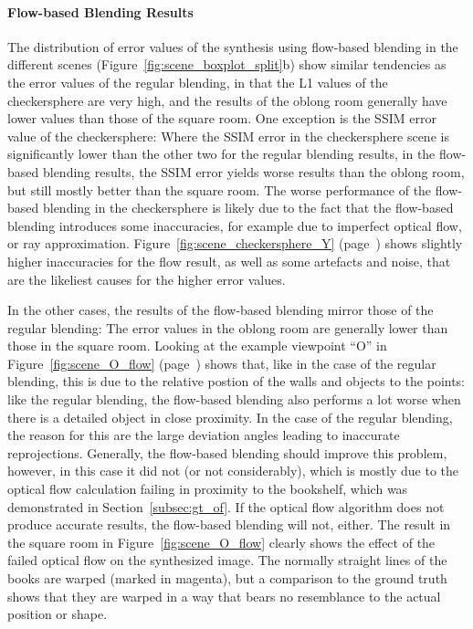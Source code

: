 \paragraph{Flow-based Blending Results}
The distribution of error values of the synthesis using flow-based blending in the different scenes (Figure~\ref{fig:scene_boxplot_split}b) show similar tendencies as the error values of the regular blending, in that the L1 values of the checkersphere are very high, and the results of the oblong room generally have lower values than those of the square room. One exception is the SSIM error value of the checkersphere: Where the SSIM error in the checkersphere scene is significantly lower than the other two for the regular blending results, in the flow-based blending results, the SSIM error yields worse results than the oblong room, but still mostly better than the square room. The worse performance of the flow-based blending in the checkersphere is likely due to the fact that the flow-based blending introduces some inaccuracies, for example due to imperfect optical flow, or ray approximation. Figure~\ref{fig:scene_checkersphere_Y} (page~\pageref{fig:scene_checkersphere_Y}) shows slightly higher inaccuracies for the flow result, as well as some artefacts and noise, that are the likeliest causes for the higher error values.

In the other cases, the results of the flow-based blending mirror those of the regular blending: The error values in the oblong room are generally lower than those in the square room. Looking at the example viewpoint ``O'' in Figure~\ref{fig:scene_O_flow} (page~\pageref{fig:scene_O_flow}) shows that, like in the case of the regular blending, this is due to the relative postion of the walls and objects to the points: like the regular blending, the flow-based blending also performs a lot worse when there is a detailed object in close proximity. In the case of the regular blending, the reason for this are the large deviation angles leading to inaccurate reprojections. Generally, the flow-based blending should improve this problem, however, in this case it did not (or not considerably), which is mostly due to the optical flow calculation failing in proximity to the bookshelf, which was demonstrated in Section~\ref{subsec:gt_of}. If the optical flow algorithm does not produce accurate results, the flow-based blending will not, either.
The result in the square room in Figure~\ref{fig:scene_O_flow} clearly shows the effect of the failed optical flow on the synthesized image. The normally straight lines of the books are warped (marked in magenta), but a comparison to the ground truth shows that they are warped in a way that bears no resemblance to the actual position or shape.

